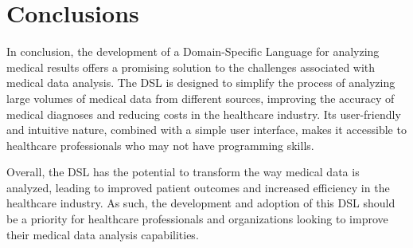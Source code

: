 \chapter*{Conclusions}

In conclusion, the development of a Domain-Specific Language for analyzing medical results offers a promising solution to the challenges associated with medical data analysis. The DSL is designed to simplify the process of analyzing large volumes of medical data from different sources, improving the accuracy of medical diagnoses and reducing costs in the healthcare industry. Its user-friendly and intuitive nature, combined with a simple user interface, makes it accessible to healthcare professionals who may not have programming skills. \par
Overall, the DSL has the potential to transform the way medical data is analyzed, leading to improved patient outcomes and increased efficiency in the healthcare industry. As such, the development and adoption of this DSL should be a priority for healthcare professionals and organizations looking to improve their medical data analysis capabilities.
